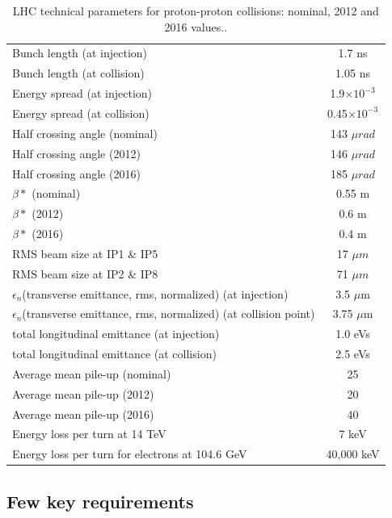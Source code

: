 \begin{table}
\begin{tabular}[!htbp]{l c}
\hline
Bunch length (at injection)   &   1.7 ns \\
Bunch length (at collision)   &   1.05 ns \\
Energy spread (at injection)   &   1.9$\times 10^{-3}$ \\
Energy spread (at collision)   &   0.45$\times 10^{-3}$  \\
\hline
Half crossing angle  (nominal)   & 143 $\mu rad$ \\
Half crossing angle  (2012)   & 146 $\mu rad$ \\
Half crossing angle  (2016)   & 185 $\mu rad$ \\
\hline
$\beta *$  (nominal) &   0.55 m\\
$\beta *$   (2012)&   0.6 m\\
$\beta *$   (2016)&   0.4 m\\
\hline
RMS beam size at IP1 \& IP5 &   17 $\mu m$ \\
RMS beam size at IP2 \& IP8 &   71 $\mu m$ \\
\hline
$\epsilon_n$(transverse emittance, rms, normalized) (at injection) &   3.5 $\mu$m\\
$\epsilon_n$(transverse emittance, rms, normalized) (at collision point) &   3.75 $\mu$m\\
\hline
total longitudinal emittance (at injection) & 1.0 eVs \\
total longitudinal emittance (at collision) & 2.5 eVs \\
\hline
Average mean pile-up (nominal) &   25 \\
Average mean pile-up (2012) &    20 \\
Average mean pile-up (2016) &    40 \\
\hline
Energy loss per turn at 14 TeV              &   7 keV   \\
Energy loss per turn for electrons at 104.6 GeV          &  40,000 keV     \\
\end{tabular}
\caption{LHC technical parameters for proton-proton collisions: nominal, 2012 and 2016 values.\cite{Bruce2016, Schoerner-Sadenius2015, LHC-parameters-2016, LHC-tdr-vol1}.}
\label{table:LHC-parameters}
\end{table}

\subsection{Few key requirements} %
\label{sub:few_key_requirements}

